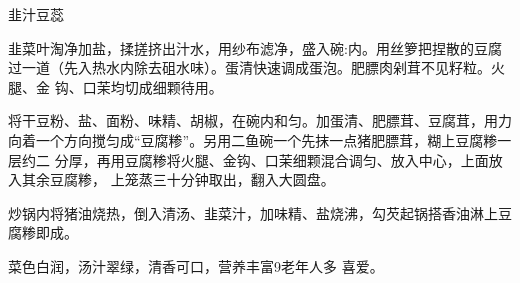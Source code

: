 \begin{recipe}{韭汁豆蕊}

\ingredients


\cooking

\step 韭菜叶淘净加盐，揉搓挤出汁水，用纱布滤净，盛入碗:内。用丝箩把捏散的豆腐
过一道（先入热水内除去砠水味）。蛋清快速调成蛋泡。肥膘肉剁茸不见籽粒。火腿、金
钩、口茉均切成细颗待用。

\step 将干豆粉、盐、面粉、味精、胡椒，在碗内和匀。加蛋清、肥膘茸、豆腐茸，用力
向着一个方向搅匀成“豆腐糁”。另用二鱼碗一个先抹一点猪肥膘茸，糊上豆腐糁一层约二
分厚，再用豆腐糁将火腿、金钩、口茉细颗混合调匀、放入中心，上面放入其余豆腐糁，
上笼蒸三十分钟取出，翻入大圆盘。

\step 炒锅内将猪油烧热，倒入清汤、韭菜汁，加味精、盐烧沸，勾芡起锅搭香油淋上豆
腐糁即成。

\features

菜色白润，汤汁翠绿，清香可口，营养丰富9老年人多 喜爱。

\end{recipe}


